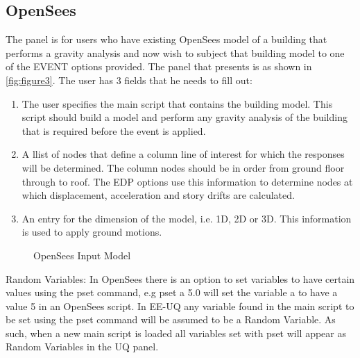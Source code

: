 \subsection{OpenSees}
The panel is for users who have existing OpenSees model of a building that performs a gravity analysis and now wish to subject that building model to one of the EVENT options provided. The panel that presents is as shown in \autoref{fig:figure3}. The user has 3 fields that he needs to fill out:
\begin{enumerate} 
\item The user specifies the main script that contains the building model. This script should build a model and perform any gravity analysis of the building that is required before the event is applied.
\item A llist of nodes that define a column line of interest for which the responses will be determined. The column nodes should be in order from ground floor through to roof. The EDP options use this information to determine nodes at which displacement, acceleration and story drifts are calculated. 
\item An entry for the dimension of the model, i.e. 1D, 2D or 3D. This information is used to apply ground motions.
\end{enumerate}

\begin{figure}[!htbp]
  \caption{OpenSees Input Model}
  \label{fig:figure3}
\end{figure}

Random Variables: In OpenSees there is an option to set variables to have certain values using the pset command, e.g pset a 5.0 will set the variable a to have a value 5 in an OpenSees script. In EE-UQ any variable found in the main script to be set using the pset command will be assumed to be a Random Variable. As such, when a new main script is loaded all variables set with pset will appear as Random Variables in the UQ panel.


